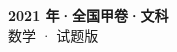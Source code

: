 \documentclass[zihao=-4, a4paper]{ctexart}
\begin{document}
\begin{center}
  {\Large\bfseries 2021 年·全国甲卷·文科}\\[4pt]
  {\large 数学 · 试题版}
\end{center}
\medskip
{}

\end{document}
